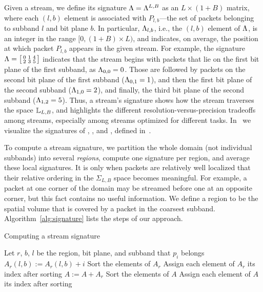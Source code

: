 Given a stream, we define its signature $\sgn = \sgn^{L,B}$ as an $L \times (1+B)$ matrix, where each $(l,b)$
element is associated with $P_{l,b}$---the set of packets belonging to subband $l$ and bit plane
$b$. In particular, $\sgn_{l,b}$, i.e., the $(l,b)$ element of $\sgn$, is 
an integer in the range $[0, (1+B)\times L)$, and indicates, on
average, the position at which packet $P_{l,b}$ appears in the given stream. For example, the
signature $\sgn=\bigl[ \begin{smallmatrix}0 & 1 & 4\\ 2 & 3 & 5\end{smallmatrix}\bigr]$ indicates
that the stream begins with packets that lie on the first bit plane of the first subband, as
$\sgn_{0,0}=0$. Those are followed by packets on the second bit plane of the first subband
($\sgn_{0,1}=1$), and then the first bit plane of the second subband ($\sgn_{1,0}=2$), and finally,
the third bit plane of the second subband ($\sgn_{1,2}=5$). Thus, a stream's signature shows how the
stream traverses the space ${\mathbb L}_{L,B}$, and highlights the different resolution-versus-precision
tradeoffs among streams, especially among \sopt streams optimized for different tasks.
In~ we visualize the signatures of \sbit, \slvl, and \swav, defined
in~.

To compute a stream signature, we partition the whole domain (not individual subbands) into several
\emph{regions}, compute one signature per region, and average these local signatures. 
It is only
when packets are relatively well localized that their relative ordering in the $\Sigma_{L,B}$ space
becomes meaningful. For example, a packet at one corner of the domain may be streamed before one at
an opposite corner, but this fact contains no useful information. We define a region to be the
spatial volume that is covered by a packet in the coarsest subband. Algorithm~\ref{alg:signature}
lists the steps of our approach.

\begin{algorithm}[h]
  \caption{Computing a stream signature}
  \begin{algorithmic}[1]
			\State Let $r$, $b$, $l$ be the region, bit plane, and subband that $p_i$ belongs
			\State $A_r(l,b) := A_r(l,b)+i$
		\EndFor
			\State Sort the elements of $A_r$
			\State Assign each element of $A_r$ its index after sorting
			\State $A := A+A_r$
		\EndFor
		\State Sort the elements of $A$
		\State Assign each element of $A$ its index after sorting
	\end{algorithmic}
	\label{alg:signature}
\end{algorithm}

